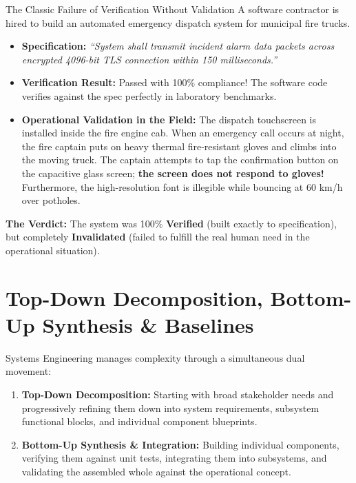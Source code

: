 \begin{examplebox}{The Classic Failure of Verification Without Validation}
A software contractor is hired to build an automated emergency dispatch system for municipal fire trucks.
\begin{itemize}[leftmargin=1.5em]
    \item \textbf{Specification:} \textit{``System shall transmit incident alarm data packets across encrypted 4096-bit TLS connection within 150 milliseconds.''}
    \item \textbf{Verification Result:} Passed with 100\% compliance! The software code verifies against the spec perfectly in laboratory benchmarks.
    \item \textbf{Operational Validation in the Field:} The dispatch touchscreen is installed inside the fire engine cab. When an emergency call occurs at night, the fire captain puts on heavy thermal fire-resistant gloves and climbs into the moving truck. The captain attempts to tap the confirmation button on the capacitive glass screen; \textbf{the screen does not respond to gloves!} Furthermore, the high-resolution font is illegible while bouncing at 60 km/h over potholes.
\end{itemize}
\textbf{The Verdict:} The system was 100\% \textbf{Verified} (built exactly to specification), but completely \textbf{Invalidated} (failed to fulfill the real human need in the operational situation).
\end{examplebox}

\section{Top-Down Decomposition, Bottom-Up Synthesis \& Baselines}
\label{sec:baselines_mgmt}

Systems Engineering manages complexity through a simultaneous dual movement:
\begin{enumerate}[leftmargin=1.5em]
    \item \textbf{Top-Down Decomposition:} Starting with broad stakeholder needs and progressively refining them down into system requirements, subsystem functional blocks, and individual component blueprints.
    \item \textbf{Bottom-Up Synthesis \& Integration:} Building individual components, verifying them against unit tests, integrating them into subsystems, and validating the assembled whole against the operational concept.
\end{enumerate}

